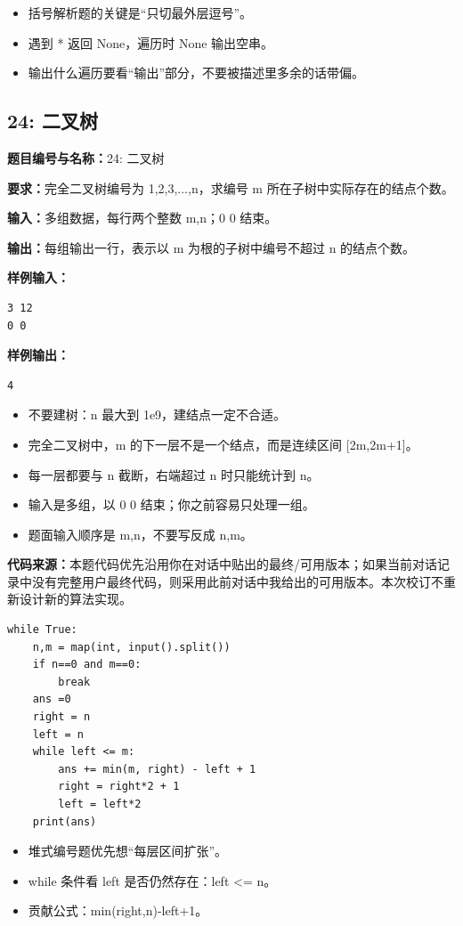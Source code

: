 \documentclass[10pt,a4paper,fontset=none]{ctexart}
\newcommand{\codesource}{\par\noindent\textbf{代码来源：}本题代码优先沿用你在对话中贴出的最终/可用版本；如果当前对话记录中没有完整用户最终代码，则采用此前对话中我给出的可用版本。本次校订不重新设计新的算法实现。\par\vspace{0.2em}}
\begin{document}
\begin{notebox}
\begin{itemize}
  \item 括号解析题的关键是“只切最外层逗号”。
  \item 遇到 * 返回 None，遍历时 None 输出空串。
  \item 输出什么遍历要看“输出”部分，不要被描述里多余的话带偏。
\end{itemize}
\end{notebox}


\subsection{24: 二叉树}
\begin{taskbox}
\textbf{题目编号与名称：}24: 二叉树\par
\textbf{要求：}完全二叉树编号为 1,2,3,...,n，求编号 m 所在子树中实际存在的结点个数。\par
\textbf{输入：}多组数据，每行两个整数 m,n；0 0 结束。\par
\textbf{输出：}每组输出一行，表示以 m 为根的子树中编号不超过 n 的结点个数。\par
\textbf{样例输入：}
\begin{lstlisting}[style=sample]
3 12
0 0
\end{lstlisting}
\textbf{样例输出：}
\begin{lstlisting}[style=sample]
4
\end{lstlisting}
\end{taskbox}
\begin{mistakebox}
\begin{itemize}
  \item 不要建树：n 最大到 1e9，建结点一定不合适。
  \item 完全二叉树中，m 的下一层不是一个结点，而是连续区间 [2m,2m+1]。
  \item 每一层都要与 n 截断，右端超过 n 时只能统计到 n。
  \item 输入是多组，以 0 0 结束；你之前容易只处理一组。
  \item 题面输入顺序是 m,n，不要写反成 n,m。
\end{itemize}
\end{mistakebox}
\codesource
\begin{lstlisting}[style=py,caption={最终可用代码（对话来源）}]
while True:
    n,m = map(int, input().split())
    if n==0 and m==0:
        break
    ans =0
    right = n
    left = n
    while left <= m:
        ans += min(m, right) - left + 1
        right = right*2 + 1
        left = left*2
    print(ans)
\end{lstlisting}
\begin{notebox}
\begin{itemize}
  \item 堆式编号题优先想“每层区间扩张”。
  \item while 条件看 left 是否仍然存在：left <= n。
  \item 贡献公式：min(right,n)-left+1。
\end{itemize}
\end{notebox}
\end{document}
